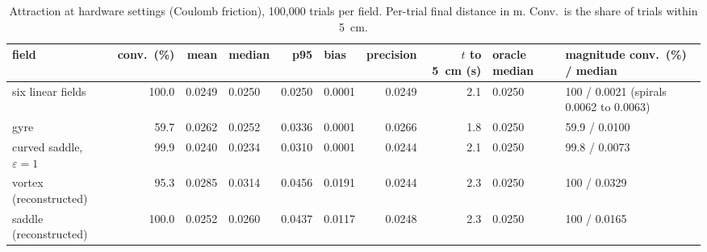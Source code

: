 \documentclass[10pt,letterpaper]{article}
\begin{document}
\begin{table}[H]
\centering\footnotesize
\setlength{\tabcolsep}{4pt}
\caption{Attraction at hardware settings (Coulomb friction), 100,000 trials per field. Per-trial final distance in m. Conv.\ is the share of trials within 5~cm.}
\label{tab:attr}
\begin{tabularx}{\textwidth}{@{}L r r P{1.55cm} r P{1.55cm} r r P{1.55cm} P{2.1cm}@{}}
\toprule
field & conv.\ (\%) & mean & median & p95 & bias & precision & $t$ to 5~cm (s) & oracle median & magnitude conv.\ (\%) / median \\
\midrule
six linear fields & 100.0 & 0.0249 & 0.0250 & 0.0250 & 0.0001 & 0.0249 & 2.1 & 0.0250 & 100 / 0.0021 (spirals 0.0062 to 0.0063) \\
gyre & 59.7 & 0.0262 & 0.0252 & 0.0336 & 0.0001 & 0.0266 & 1.8 & 0.0250 & 59.9 / 0.0100 \\
curved saddle, $\varepsilon = 1$ & 99.9 & 0.0240 & 0.0234 & 0.0310 & 0.0001 & 0.0244 & 2.1 & 0.0250 & 99.8 / 0.0073 \\
vortex (reconstructed) & 95.3 & 0.0285 & 0.0314 & 0.0456 & 0.0191 & 0.0244 & 2.3 & 0.0250 & 100 / 0.0329 \\
saddle (reconstructed) & 100.0 & 0.0252 & 0.0260 & 0.0437 & 0.0117 & 0.0248 & 2.3 & 0.0250 & 100 / 0.0165 \\
\bottomrule
\end{tabularx}
\end{table}
\end{document}
